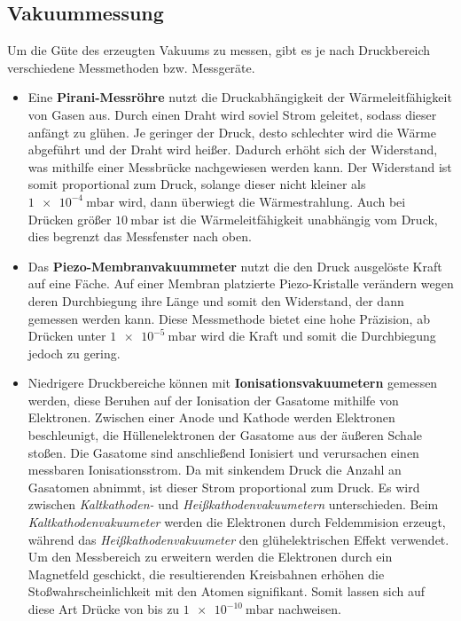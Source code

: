 \subsection{Vakuummessung}
Um die Güte des erzeugten Vakuums zu messen, gibt es je nach Druckbereich verschiedene Messmethoden bzw. Messgeräte.
\begin{itemize}
    \item Eine \textbf{Pirani-Messröhre} nutzt die Druckabhängigkeit der Wärmeleitfähigkeit von Gasen aus. Durch einen Draht wird
    soviel Strom geleitet, sodass dieser anfängt zu glühen. Je geringer der Druck, desto schlechter wird die Wärme abgeführt und der
    Draht wird heißer. Dadurch erhöht sich der Widerstand, was mithilfe einer Messbrücke nachgewiesen werden kann. Der Widerstand ist somit
    proportional zum Druck, solange dieser nicht kleiner als $\qty{1e-4}{\milli\bar}$ wird, dann überwiegt die Wärmestrahlung.
    Auch bei Drücken größer $\qty{10}{\milli\bar}$ ist die Wärmeleitfähigkeit unabhängig vom Druck, dies begrenzt das Messfenster nach oben. \cite{Druckmessung}
    \item Das \textbf{Piezo-Membranvakuummeter} nutzt die den Druck ausgelöste Kraft auf eine Fäche. Auf einer Membran platzierte Piezo-Kristalle
    verändern wegen deren Durchbiegung ihre Länge und somit den Widerstand, der dann gemessen werden kann. Diese Messmethode bietet eine hohe Präzision,
    ab Drücken unter $\qty{1e-5}{\milli\bar}$ wird die Kraft und somit die Durchbiegung jedoch zu gering. \cite{Druckmessung}
    \item Niedrigere Druckbereiche können mit \textbf{Ionisationsvakuumetern} gemessen werden, diese Beruhen auf der Ionisation der Gasatome mithilfe von
    Elektronen. Zwischen einer Anode und Kathode werden Elektronen beschleunigt, die Hüllenelektronen der Gasatome aus der äußeren Schale stoßen.
    Die Gasatome sind anschließend Ionisiert und verursachen einen messbaren Ionisationsstrom. Da mit sinkendem Druck die Anzahl an Gasatomen abnimmt,
    ist dieser Strom proportional zum Druck. Es wird zwischen \textit{Kaltkathoden-} und \textit{Heißkathodenvakuumetern} unterschieden.
    Beim \textit{Kaltkathodenvakuumeter} werden die Elektronen durch Feldemmision erzeugt, während das \textit{Heißkathodenvakuumeter} den
    glühelektrischen Effekt verwendet. Um den Messbereich zu erweitern werden die Elektronen durch ein Magnetfeld geschickt, die resultierenden
    Kreisbahnen erhöhen die Stoßwahrscheinlichkeit mit den Atomen signifikant. Somit lassen sich auf diese Art Drücke von bis zu $\qty{1e-10}{\milli\bar}$
    nachweisen. \cite{Druckmessung}
\end{itemize}